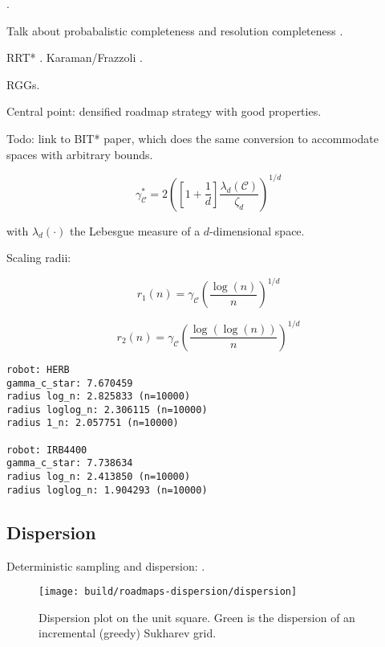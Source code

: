 \citep{janson2015deterministicsampling}.

Talk about probabalistic completeness and resolution completeness
\citep{cheng2004rescomplete}.

RRT* \citep{karaman2010rrtstar}.
Karaman/Frazzoli \citep{karaman2011samplingoptimal}.

RGGs.

Central point: densified roadmap strategy with good properties.

Todo: link to BIT* paper, which does the same conversion to
accommodate spaces with arbitrary bounds.

\begin{equation}
   \gamma^*_{\mathcal{C}}
      = 2 \left( \left[ 1 + \frac{1}{d} \right]
         \frac{\lambda_d(\mathcal{C})}{\zeta_d} \right)^{1/d}
\end{equation}

with $\lambda_d(\cdot)$ the Lebesgue measure of a $d$-dimensional
space.

Scaling radii:

\begin{equation}
   r_1(n) = \gamma_{\mathcal{C}} \left( \frac{\log(n)}{n} \right)^{1/d}
\end{equation}

\begin{equation}
   r_2(n) = \gamma_{\mathcal{C}} \left( \frac{\log(\log(n))}{n} \right)^{1/d}
\end{equation}

\begin{verbatim}
robot: HERB
gamma_c_star: 7.670459
radius log_n: 2.825833 (n=10000)
radius loglog_n: 2.306115 (n=10000)
radius 1_n: 2.057751 (n=10000)

robot: IRB4400
gamma_c_star: 7.738634
radius log_n: 2.413850 (n=10000)
radius loglog_n: 1.904293 (n=10000)
\end{verbatim}

\subsection{Dispersion}

Deterministic sampling and dispersion:
\citep{janson2015deterministicsampling}.

\begin{figure}
   \centering
   \texttt{[image: build/roadmaps-dispersion/dispersion]}
   \caption{Dispersion plot on the unit square.
      Green is the dispersion of an incremental (greedy) Sukharev
      grid.}
\end{figure}

